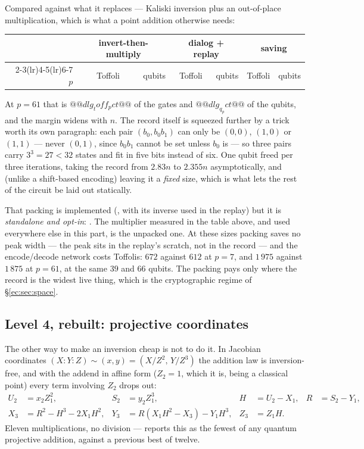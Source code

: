 \noindent
Compared against what it replaces --- Kaliski inversion plus an out-of-place multiplication, which
is what a point addition otherwise needs:

\begin{center}\small
\begin{tabular}{@{}rrrrrrr@{}}
\toprule
& \multicolumn{2}{c}{invert-then-multiply} & \multicolumn{2}{c}{dialog + replay} & \multicolumn{2}{c}{saving}\\
\cmidrule(lr){2-3}\cmidrule(lr){4-5}\cmidrule(lr){6-7}
$p$ & Toffoli & qubits & Toffoli & qubits & Toffoli & qubits\\
\midrule
\bottomrule
\end{tabular}
\end{center}

\noindent
At $p=61$ that is $@@dlg_toff_pct@@$ of the gates and $@@dlg_q_pct@@$ of the qubits, and the
margin widens with $n$. The record itself is
squeezed further by a trick worth its own paragraph: each pair $(b_0, b_0b_1)$ can only be
$(0,0)$, $(1,0)$ or $(1,1)$ --- never $(0,1)$, since $b_0b_1$ cannot be set unless $b_0$ is --- so
three pairs carry $3^3=27<32$ states and fit in five bits instead of six. One qubit freed per three
iterations, taking the record from $2.83n$ to $2.355n$ asymptotically, and (unlike a shift-based
encoding) leaving it a \emph{fixed} size, which is what lets the rest of the circuit be laid out
statically.

That packing is implemented (, with its inverse used in the replay)
but it is \emph{standalone and opt-in}: . The multiplier
measured in the table above, and used everywhere else in this part, is the unpacked one. At these
sizes packing saves no peak width --- the peak sits in the replay's scratch, not in the record ---
and the encode/decode network costs Toffolis: $672$ against $612$ at $p=7$, and $1\,975$ against
$1\,875$ at $p=61$, at the same $39$ and $66$ qubits. The packing pays only where the record is
the widest live thing, which is the cryptographic regime of \S\ref{ec:sec:space}.

\subsection{Level 4, rebuilt: projective coordinates}\label{ec:sec:proj}

The other way to make an inversion cheap is not to do it. In Jacobian coordinates
$(X:Y:Z)\sim(x,y)=(X/Z^2,\,Y/Z^3)$ the addition law is inversion-free, and with the addend in
affine form ($Z_2=1$, which it is, being a classical point) every term involving $Z_2$ drops out:
\[
\begin{aligned}
U_2 &= x_2Z_1^2, & S_2 &= y_2Z_1^3, & H &= U_2-X_1, & R &= S_2-Y_1,\\
X_3 &= R^2-H^3-2X_1H^2, & Y_3 &= R(X_1H^2-X_3)-Y_1H^3, & Z_3 &= Z_1H. &&
\end{aligned}
\]
Eleven multiplications, no division --- \cite{ec:kim26} reports this as the fewest of any quantum
projective addition, against a previous best of twelve.


